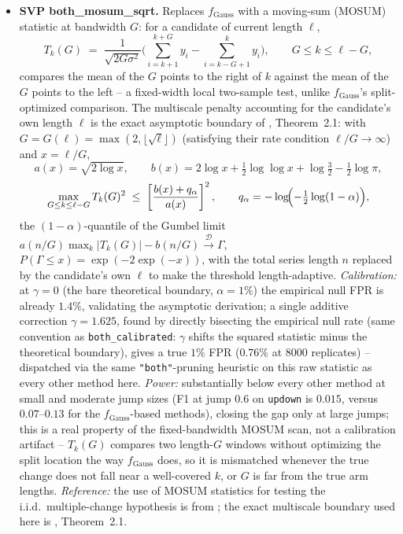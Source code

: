 \documentclass[11pt]{article}
\begin{document}
\begin{itemize}
\item \textbf{SVP both\_mosum\_sqrt.} Replaces $f_{\mathrm{Gauss}}$ with a
moving-sum (MOSUM) statistic at bandwidth $G$: for a candidate of current
length $\ell$,
\[
T_k(G) \;=\; \frac{1}{\sqrt{2G\sigma^2}}\Biggl(\sum_{i=k+1}^{k+G}y_i-\sum_{i=k-G+1}^{k}y_i\Biggr),
\qquad G\le k\le \ell-G,
\]
compares the mean of the $G$ points to the right of $k$ against the mean
of the $G$ points to the left -- a fixed-width local two-sample test,
unlike $f_{\mathrm{Gauss}}$'s split-optimized comparison. The multiscale
penalty accounting for the candidate's own length $\ell$ is the exact
asymptotic boundary of \cite{eichinger2018}, Theorem~2.1: with
$G=G(\ell)=\max(2,\lfloor\sqrt\ell\rfloor)$ (satisfying their rate
condition $\ell/G\to\infty$) and $x=\ell/G$,
\[
a(x)=\sqrt{2\log x},\qquad
b(x)=2\log x+\tfrac12\log\log x+\log\tfrac32-\tfrac12\log\pi,
\]
\[
\max_{G\le k\le \ell-G}T_k(G)^2 \;\le\;
\left[\frac{b(x)+q_\alpha}{a(x)}\right]^2,
\qquad q_\alpha=-\log\!\Bigl(-\tfrac12\log(1-\alpha)\Bigr),
\]
the $(1-\alpha)$-quantile of the Gumbel limit
$a(n/G)\max_k|T_k(G)|-b(n/G)\xrightarrow{\mathcal D}\Gamma$,
$P(\Gamma\le x)=\exp(-2\exp(-x))$, with the total series length $n$
replaced by the candidate's own $\ell$ to make the threshold length-adaptive.
\emph{Calibration:} at $\gamma=0$ (the bare theoretical boundary, $\alpha=1\%$)
the empirical null FPR is already $1.4\%$, validating the asymptotic
derivation; a single additive correction $\gamma=1.625$, found by directly
bisecting the empirical null rate (same convention as
\texttt{both\_calibrated}: $\gamma$ shifts the squared statistic minus the
theoretical boundary), gives a true $1\%$ FPR ($0.76\%$ at $8000$
replicates) -- dispatched via the same \texttt{"both"}-pruning heuristic
on this raw statistic as every other method here. \emph{Power:}
substantially below every other method at small and moderate jump sizes
(F1 at jump $0.6$ on \texttt{updown} is $0.015$, versus $0.07$--$0.13$ for
the $f_{\mathrm{Gauss}}$-based methods), closing the gap only at large
jumps; this is a real property of the fixed-bandwidth MOSUM scan, not a
calibration artifact -- $T_k(G)$ compares two length-$G$ windows without
optimizing the split location the way $f_{\mathrm{Gauss}}$ does, so it is
mismatched whenever the true change does not fall near a well-covered $k$,
or $G$ is far from the true arm lengths. \emph{Reference:} the use of
MOSUM statistics for testing the i.i.d.\ multiple-change hypothesis is
from \cite{huskova2001}; the exact multiscale boundary used here is
\cite{eichinger2018}, Theorem~2.1.


\end{itemize}
\end{document}
